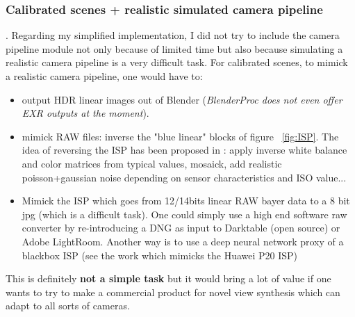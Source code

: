 \subsubsection*{Calibrated scenes + realistic simulated camera pipeline}.
\noindent Regarding my simplified implementation, I did not try to include the camera pipeline module not only because of limited time but also because simulating a realistic camera pipeline is a very difficult task.
For calibrated scenes, to mimick a realistic camera pipeline, one would have to:
\begin{itemize}
    \item output HDR linear images out of Blender (\textit{BlenderProc does not even offer EXR outputs at the moment}).
    \item mimick RAW files: inverse the "blue linear" blocks of figure ~\cref*{fig:ISP}. The idea of reversing the ISP has been proposed in \cite{brooks2018unprocessing}: apply inverse white balance and color matrices from typical values, mosaick, add realistic poisson+gaussian noise depending on sensor characteristics and ISO value...
    \item Mimick the ISP which goes from 12/14bits linear RAW bayer data to a 8 bit jpg (which is a difficult task). One could simply use a high end software raw converter by re-introducing a DNG as input to Darktable (open source) or Adobe LightRoom. Another way is to use a deep neural network proxy of a blackbox ISP (see the work \cite{ignatov2020replacing} which mimicks the Huawei P20 ISP)
\end{itemize}
This is definitely \textbf{not a simple task} but it would bring a lot of value if one wants to try to make a commercial product for novel view synthesis which can adapt to all sorts of cameras. 